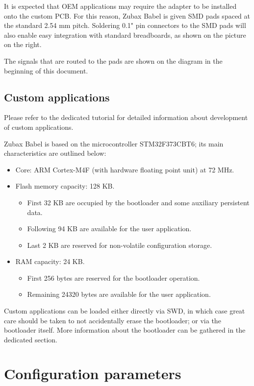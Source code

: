 \documentclass{zubaxdoc}
\begin{document}
It is expected that OEM applications may require the adapter to be installed onto the custom PCB. For this reason, Zubax Babel is given SMD pads spaced at the standard 2.54 mm pitch. Soldering 0.1" pin connectors to the SMD pads will also enable easy integration with standard breadboards, as shown on the picture on the right.

The signals that are routed to the pads are shown on the diagram in the beginning of this document.

\section{Custom applications}

Please refer to the dedicated tutorial for detailed information about development of custom applications.

Zubax Babel is based on the microcontroller STM32F373CBT6; its main characteristics are outlined below:

\begin{itemize}
\item Core: ARM Cortex-M4F (with hardware floating point unit) at 72 MHz.
\item Flash memory capacity: 128 KB.
\begin{itemize}
\item First 32 KB are occupied by the bootloader and some auxiliary persistent data.
\item Following 94 KB are available for the user application.
\item Last 2 KB are reserved for non-volatile configuration storage.
\end{itemize}
\item RAM capacity: 24 KB.
\begin{itemize}
\item First 256 bytes are reserved for the bootloader operation.
\item Remaining 24320 bytes are available for the user application.
\end{itemize}
\end{itemize}

Custom applications can be loaded either directly via SWD, in which case great care should be taken to not accidentally erase the bootloader; or via the bootloader itself. More information about the bootloader can be gathered in the dedicated section.

\chapter{Configuration parameters}
\end{document}
